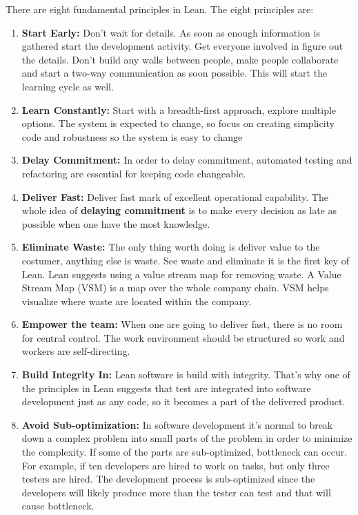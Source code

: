 \documentclass[UKenglish]{ifimaster}  %
\begin{document}
There are eight fundamental principles in Lean. The eight principles are:
\begin{enumerate}
\centering
\item \textbf{Start Early:}  Don't wait for details. As soon as enough information is gathered start the development activity. Get everyone involved in figure out the details. Don't build any walls between people, make people collaborate and start a two-way communication as soon possible. This will start the learning cycle as well.

\item \textbf{Learn Constantly:} Start with a breadth-first approach, explore multiple options. The system is expected to change, so focus on creating simplicity code and robustness so the system is easy to change

\item \textbf{Delay Commitment:} 
In order to delay commitment, automated testing and refactoring are essential for keeping code changeable. 

\item \textbf{Deliver Fast:}
Deliver fast mark of excellent operational capability. The whole idea of \textbf{delaying commitment} is to make every decision as late as possible when one have the most knowledge.
\item \textbf{Eliminate Waste:}
The only thing worth doing is deliver value to the costumer, anything else is waste.  See waste and eliminate it is the first key of Lean.  Lean suggests using a value stream map for removing waste. A Value Stream Map (VSM) is a map over the whole company chain. VSM helps visualize where waste are located within the company.
\item \textbf{Empower the team:} When one are going to deliver fast, there is no room for central control. The work environment should be structured so work and workers are self-directing.

\item \textbf{Build Integrity In:} Lean software is build with integrity. That's why one of the principles in Lean suggests that test are integrated into software development just as any code, so it becomes a part of the delivered product. 

\item \textbf{Avoid Sub-optimization:} In software development it's normal to break down a complex problem into small parts of the problem in order to minimize the complexity.  If some of the parts are sub-optimized, bottleneck can occur. For example, if ten developers are hired to work on tasks, but only three testers are hired. The development process is sub-optimized since the developers will likely produce more than the tester can test and that will cause bottleneck.
\end{enumerate}
\parencite{poppendieck2003lean}
\end{document}
